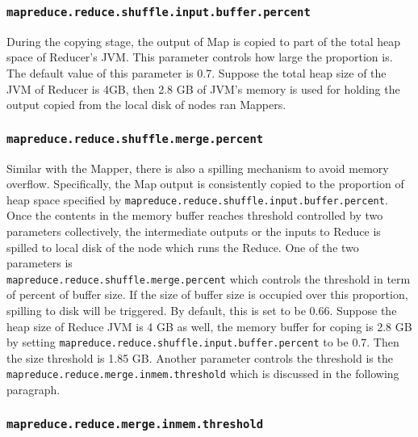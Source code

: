\subsubsection{\texttt{mapreduce.reduce.shuffle.input.buffer.percent}}

During the copying stage, the output of Map is copied to part of the total heap 
space of Reducer's JVM. This parameter controls how large the proportion is.
The default value of this parameter is 0.7. Suppose the total heap size of the
JVM of Reducer is 4GB, then 2.8 GB of JVM's memory is used for holding the output
copied from the local disk of nodes ran Mappers.

\subsubsection{\texttt{mapreduce.reduce.shuffle.merge.percent}}

Similar with the Mapper, there is also a spilling mechanism to avoid memory 
overflow. Specifically, the Map output is consistently copied to the proportion 
of heap space specified by \texttt{mapreduce.reduce.shuffle.input.buffer.percent}.
Once the contents in the memory buffer reaches threshold controlled by two 
parameters collectively, the intermediate outputs or the inputs to Reduce is 
spilled to local disk of the node which runs the Reduce. One of the two parameters 
is \\
\texttt{mapreduce.reduce.shuffle.merge.percent} which controls the threshold in 
term of percent of buffer size. If the size of buffer size is occupied over this
proportion, spilling to disk will be triggered. By default, this is set to be 
0.66. Suppose the heap size of Reduce JVM is 4 GB as well, the memory buffer for
coping is 2.8 GB by setting \texttt{mapreduce.reduce.shuffle.input.buffer.percent}
to be 0.7. Then the size threshold is 1.85 GB. Another parameter controls the
threshold is the \texttt{mapreduce.reduce.merge.inmem.threshold} which is discussed
in the following paragraph.

\subsubsection{\texttt{mapreduce.reduce.merge.inmem.threshold}}

